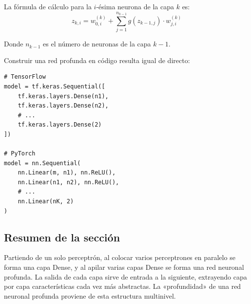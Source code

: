 La fórmula de cálculo para la $i$-ésima neurona de la capa $k$ es:
$$z_{k,i} = w_{0,i}^{(k)} + \sum_{j=1}^{n_{k-1}} g(z_{k-1,j}) \cdot w_{j,i}^{(k)}$$

Donde $n_{k-1}$ es el número de neuronas de la capa $k-1$.

Construir una red profunda en código resulta igual de directo:

\begin{lstlisting}[caption={Redes profundas en TensorFlow y PyTorch}]
# TensorFlow
model = tf.keras.Sequential([
    tf.keras.layers.Dense(n1),
    tf.keras.layers.Dense(n2),
    # ...
    tf.keras.layers.Dense(2)
])

# PyTorch
model = nn.Sequential(
    nn.Linear(m, n1), nn.ReLU(),
    nn.Linear(n1, n2), nn.ReLU(),
    # ...
    nn.Linear(nK, 2)
)
\end{lstlisting}

\subsection{Resumen de la sección}

Partiendo de un solo perceptrón, al colocar varios perceptrones en paralelo se forma una capa Dense, y al apilar varias capas Dense se forma una red neuronal profunda. La salida de cada capa sirve de entrada a la siguiente, extrayendo capa por capa características cada vez más abstractas. La «profundidad» de una red neuronal profunda proviene de esta estructura multinivel.

